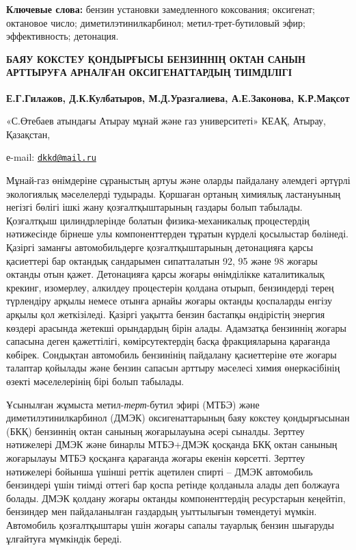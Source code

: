 {\bfseries Ключевые слова:} бензин установки замедленного коксования;
оксигенат; октановое число; диметилэтинилкарбинол; метил-трет-бутиловый
эфир; эффективность; детонация.

\begin{articleheader}
{\bfseries БАЯУ КОКСТЕУ ҚОНДЫРҒЫСЫ БЕНЗИННІҢ ОКТАН САНЫН АРТТЫРУҒА АРНАЛҒАН
ОКСИГЕНАТТАРДЫҢ ТИІМДІЛІГІ}

{\bfseries Е.Г.Гилажов, Д.К.Кулбатыров\textsuperscript{\envelope }, М.Д.Уразгалиева,
А.Е.Законова, К.Р.Мақсот}
\end{articleheader}

\begin{affiliation}
«С.Өтебаев атындағы Атырау мұнай және газ университеті» КЕАҚ, Атырау,
Қазақстан,

е-mail: \href{mailto:dkkd@mail.ru}{\nolinkurl{dkkd@mail.ru}}
\end{affiliation}

Мұнай-газ өнімдеріне сұраныстың артуы және оларды пайдалану әлемдегі
әртүрлі экологиялық мәселелерді тудырады. Қоршаған ортаның химиялық
ластануының негізгі бөлігі ішкі жану қозғалтқыштарының газдары болып
табылады. Қозғалтқыш цилиндрлерінде болатын физика-механикалық
процестердің нәтижесінде бірнеше улы компоненттерден тұратын күрделі
қосылыстар бөлінеді. Қазіргі заманғы автомобильдерге қозғалтқыштарының
детонацияға қарсы қасиеттері бар октандық сандарымен сипатталатын 92, 95
және 98 жоғары октанды отын қажет. Детонацияға қарсы жоғары өнімділікке
каталитикалық крекинг, изомерлеу, алкилдеу процестерін қолдана отырып,
бензиндерді терең түрлендіру арқылы немесе отынға арнайы жоғары октанды
қоспаларды енгізу арқылы қол жеткізіледі. Қазіргі уақытта бензин
бастапқы өндірістің энергия көздері арасында жетекші орындардың бірін
алады. Адамзатқа бензиннің жоғары сапасына деген қажеттілігі,
көмірсутектердің басқа фракцияларына қарағанда көбірек. Сондықтан
автомобиль бензинінің пайдалану қасиеттеріне өте жоғары талаптар
қойылады және бензин сапасын арттыру мәселесі химия өнеркәсібінің өзекті
мәселелерінің бірі болып табылады.

Ұсынылған жұмыста метил-\emph{терт}-бутил эфирі (МТБЭ) және
диметилэтинилкарбинол (ДМЭК) оксигенаттарының баяу кокстеу қондырғысынан
(БКҚ) бензиннің октан санының жоғарылауына әсері сыналды. Зерттеу
нәтижелері ДМЭК және бинарлы МТБЭ+ДМЭК қосқанда БКҚ октан санының
жоғарылауы МТБЭ қосқанға қарағанда жоғары екенін көрсетті. Зерттеу
нәтижелері бойынша үшінші реттік ацетилен спирті -- ДМЭК автомобиль
бензиндері үшін тиімді оттегі бар қоспа ретінде қолданыла алады деп
болжауға болады. ДМЭК қолдану жоғары октанды компоненттердің ресурстарын
кеңейтіп, бензиндер мен пайдаланылған газдардың уыттылығын төмендетуі
мүмкін. Автомобиль қозғалтқыштары үшін жоғары сапалы тауарлық бензин
шығаруды ұлғайтуға мүмкіндік береді.


